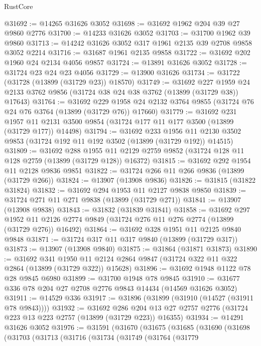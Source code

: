 \begin{lexlean}{RustCore}
\begin{coremodule}
@31692 := @14265 @31626 @3052
@31698 := @31692 @1962 @204 @39 @27 @9860 @2776
@31700 := @14233 @31626 @3052
@31703 := @31700 @1962 @39 @9860
@31713 := @14242 @31626 @3052 @317 @1961 @2135 @39 @2708 @9858 @3052 @2214
@31716 := @31687 @1961 @2135 @9858
@31722 := @31692 @202 @1960 @24 @2134 @4056 @9857
@31724 := @13891 @31626 @3052
@31728 := @31724 @23 @24 @23 @4056
@31729 := @13900 @31626
@31734 := @31722 (@31728 (@13899 (@31729 @23)) @18570)
@31749 := @31692
    @227
    @1959
    @24
    @2133
    @3762
    @9856
    (@31724 @38 @24 @38 @3762 (@13899 (@31729 @38)) @17643)
@31764 := @31692
    @229
    @1958
    @24
    @2132
    @3764
    @9855
    (@31724 @76 @24 @76 @3764 (@13899 (@31729 @76)) @17660)
@31779 := @31692
    @231
    @1957
    @11
    @2131
    @3500
    @9854
    (@31724 @177 @11 @177 @3500 (@13899 (@31729 @177)) @14498)
@31794 := @31692
    @233
    @1956
    @11
    @2130
    @3502
    @9853
    (@31724 @192 @11 @192 @3502 (@13899 (@31729 @192)) @14515)
@31809 := @31692
    @288
    @1955
    @11
    @2129
    @2759
    @9852
    (@31724 @128 @11 @128 @2759 (@13899 (@31729 @128)) @16372)
@31815 := @31692 @292 @1954 @11 @2128 @9836 @9851
@31822 := @31724 @266 @11 @266 @9836 (@13899 (@31729 @266))
@31824 := @13907 (@13908 @9836)
@31826 := @31815 (@31822 @31824)
@31832 := @31692 @294 @1953 @11 @2127 @9838 @9850
@31839 := @31724 @271 @11 @271 @9838 (@13899 (@31729 @271))
@31841 := @13907 (@13908 @9838)
@31843 := @31832 (@31839 @31841)
@31858 := @31692
    @297
    @1952
    @11
    @2126
    @2774
    @9849
    (@31724 @276 @11 @276 @2774 (@13899 (@31729 @276)) @16492)
@31864 := @31692 @328 @1951 @11 @2125 @9840 @9848
@31871 := @31724 @317 @11 @317 @9840 (@13899 (@31729 @317))
@31873 := @13907 (@13908 @9840)
@31875 := @31864 (@31871 @31873)
@31890 := @31692
    @341
    @1950
    @11
    @2124
    @2864
    @9847
    (@31724 @322 @11 @322 @2864 (@13899 (@31729 @322)) @15628)
@31896 := @31692 @1948 @1122 @78 @28 @9845 @6980
@31899 := @31700 @1948 @78 @9845
@31910 := @31677 @336 @78 @204 @27 @2708 @2776 @9843 @14434 (@14569 @31626 @3052)
@31911 := @14529 @336
@31917 := @31896 (@31899 (@31910 (@14527 (@31911 @78 @9843))))
@31932 := @31692
    @286
    @204
    @13
    @27
    @2757
    @2776
    (@31724 @223 @13 @223 @2757 (@13899 (@31729 @223)) @16355)
@31934 := @14291 @31626 @3052
@31976 := @31591
    (@31670
      (@31675
        (@31685
          (@31690
            (@31698
              (@31703
                (@31713
                  (@31716
                    (@31734
                      (@31749
                        (@31764
                          (@31779

\end{coremodule}
\end{lexlean}

